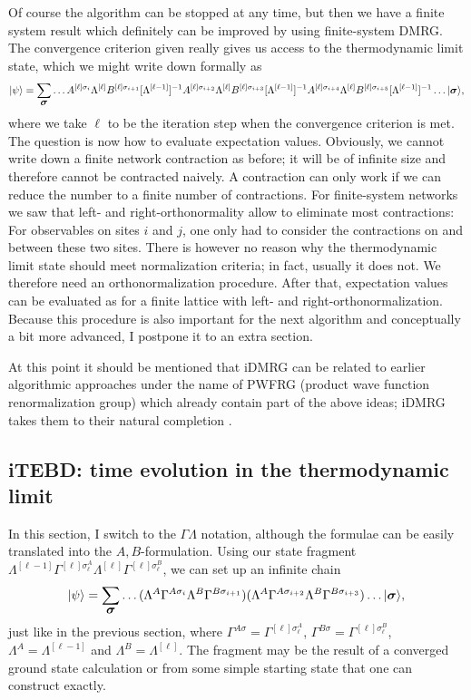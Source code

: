 \documentclass[a4paper,10pt,oneside,onecolumn,1p,times]{elsarticle}
\newcommand{\ket}[1]{\mbox{$| #1  \rangle$}}
\newcommand{\fat}[1]{\mbox{\boldmath$#1$\unboldmath}}	%
\begin{document}
Of course the algorithm can be stopped at any time, but then we have a finite system result which definitely can be improved by using finite-system DMRG. The convergence criterion given really gives us access to the thermodynamic limit state, which we might write down formally as
\begin{equation}
\ket{\psi} = \sum_{\fat{\sigma}} \ldots A^{[\ell]\sigma_i}\Lambda^{[\ell]} B^{[\ell]\sigma_{i+1}} [\Lambda^{[\ell-1]}]^{-1}A^{[\ell]\sigma_{i+2}}\Lambda^{[\ell]} B^{[\ell]\sigma_{i+3}} [\Lambda^{[\ell-1]}]^{-1}A^{[\ell]\sigma_{i+4}}\Lambda^{[\ell]} B^{[\ell]\sigma_{i+5}} [\Lambda^{[\ell-1]}]^{-1} \ldots 
 \ket{\fat{\sigma}} ,
\end{equation}
where we take $\ell$ to be the iteration step when the convergence criterion is met. The question is now how to evaluate expectation values. Obviously, we cannot write down a finite network contraction as before; it will be of infinite size and therefore cannot be contracted naively. A contraction can only work if we can reduce the number to a finite number of contractions. For finite-system networks we saw that left- and right-orthonormality allow to eliminate most contractions: For observables on sites $i$ and $j$, one only had to consider the contractions on and between these two sites. There is however no reason why the thermodynamic limit state should meet normalization criteria; in fact, usually it does not. We therefore need an orthonormalization procedure. After that, expectation values can be evaluated as for a finite lattice with left- and right-orthonormalization. Because this procedure is also important for the next algorithm and conceptually a bit more advanced, I postpone it to an extra section. 

At this point it should be mentioned that iDMRG can be related to earlier algorithmic approaches under the name of PWFRG (product wave function renormalization group) \cite{NishinoOkunishi95,Hieida97,Ueda06} which already contain part of the above ideas; iDMRG takes them to their natural completion \cite{Ueda08,Ueda10}.

\subsection{iTEBD: time evolution in the thermodynamic limit}
In this section, I switch to the $\Gamma\Lambda$ notation, although the formulae can be easily translated into the $A,B$-formulation. Using our state fragment $\Lambda^{[\ell-1]} \Gamma^{[\ell]\sigma_\ell^A} \Lambda^{[\ell]} \Gamma^{[\ell]\sigma_\ell^B}$, we can set up an infinite chain
\begin{equation}
\ket{\psi} = \sum_{\fat{\sigma}} \ldots (\Lambda^A \Gamma^{A \sigma_i} \Lambda^B \Gamma^{B \sigma_{i+1}})(\Lambda^A \Gamma^{A \sigma_{i+2}} \Lambda^B \Gamma^{B \sigma_{i+3}}) \ldots \ket{\fat{\sigma}} ,
\end{equation}
just like in the previous section, where $\Gamma^{A\sigma}= \Gamma^{[\ell]\sigma_\ell^A}$,
$\Gamma^{B\sigma}= \Gamma^{[\ell]\sigma_\ell^B}$, $\Lambda^A=\Lambda^{[\ell-1]}$ and 
$\Lambda^B=\Lambda^{[\ell]}$. The fragment may be the result of a converged ground state calculation or from some simple starting state that one can construct exactly. 
\end{document}
